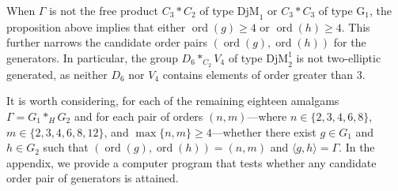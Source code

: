 \documentclass[12pt,leqno]{amsart}
\newcommand{\2}{L^2_{\rm per}(0, T)}
\newcommand{\ord}{{\operatorname{ord}}}
\numberwithin{equation}{section}
\numberwithin{figure}{section}
\begin{document}
When $\Gamma$ is not the free product $C_3*C_2$ of type $\mathrm{DjM}_1$ or $C_3*C_3$ of type $\mathrm{G}_1$, the proposition above implies that either $\ord(g)\geq 4$ or $\ord(h)\geq 4$. This further narrows the candidate order pairs $(\ord(g),\ord(h))$ for the generators. In particular, the group $D_6*_{C_2}V_4$ of type $\mathrm{DjM}_2^1$ is not two-elliptic generated, as neither $D_6$ nor $V_4$ contains elements of order greater than $3$.

It is worth considering, for each of the remaining eighteen amalgams $\Gamma = G_1*_HG_2$ and for each pair of orders $(n,m)$—where $n\in \{2,3,4,6,8\}$, $m\in \{2,3,4,6,8,12\}$, and $\max\{n,m\}\geq 4$—whether there exist $g\in G_1$ and $h\in G_2$ such that $(\ord(g),\ord(h)) = (n,m)$ and $\langle g,h\rangle = \Gamma$. In the appendix, we provide a computer program that tests whether any candidate order pair of generators is attained.
\end{document}
